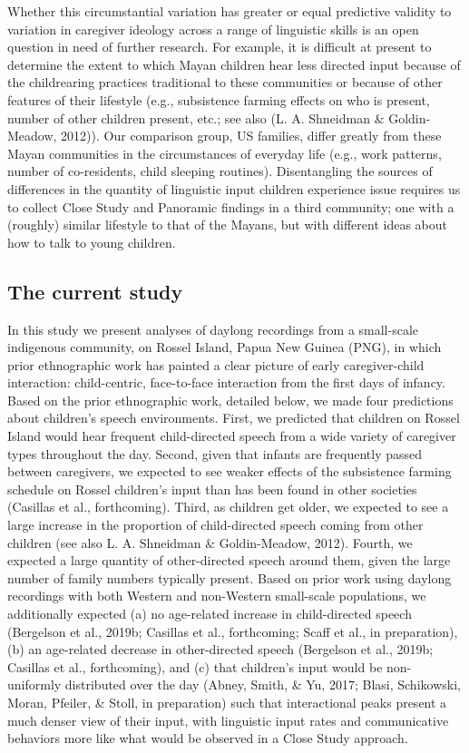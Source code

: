 \documentclass[,man,floatsintext]{apa6}
\begin{document}
Whether this circumstantial variation has greater or equal predictive
validity to variation in caregiver ideology across a range of linguistic
skills is an open question in need of further research. For example, it
is difficult at present to determine the extent to which Mayan children
hear less directed input because of the childrearing practices
traditional to these communities or because of other features of their
lifestyle (e.g., subsistence farming effects on who is present, number
of other children present, etc.; see also (L. A. Shneidman \&
Goldin-Meadow, 2012)). Our comparison group, US families, differ greatly
from these Mayan communities in the circumstances of everyday life
(e.g., work patterns, number of co-residents, child sleeping routines).
Disentangling the sources of differences in the quantity of linguistic
input children experience issue requires us to collect Close Study and
Panoramic findings in a third community; one with a (roughly) similar
lifestyle to that of the Mayans, but with different ideas about how to
talk to young children.

\subsection{The current study}\label{the-current-study}

In this study we present analyses of daylong recordings from a
small-scale indigenous community, on Rossel Island, Papua New Guinea
(PNG), in which prior ethnographic work has painted a clear picture of
early caregiver-child interaction: child-centric, face-to-face
interaction from the first days of infancy. Based on the prior
ethnographic work, detailed below, we made four predictions about
children's speech environments. First, we predicted that children on
Rossel Island would hear frequent child-directed speech from a wide
variety of caregiver types throughout the day. Second, given that
infants are frequently passed between caregivers, we expected to see
weaker effects of the subsistence farming schedule on Rossel children's
input than has been found in other societies (Casillas et al.,
forthcoming). Third, as children get older, we expected to see a large
increase in the proportion of child-directed speech coming from other
children (see also L. A. Shneidman \& Goldin-Meadow, 2012). Fourth, we
expected a large quantity of other-directed speech around them, given
the large number of family numbers typically present. Based on prior
work using daylong recordings with both Western and non-Western
small-scale populations, we additionally expected (a) no age-related
increase in child-directed speech (Bergelson et al., 2019b; Casillas et
al., forthcoming; Scaff et al., in preparation), (b) an age-related
decrease in other-directed speech (Bergelson et al., 2019b; Casillas et
al., forthcoming), and (c) that children's input would be non-uniformly
distributed over the day (Abney, Smith, \& Yu, 2017; Blasi, Schikowski,
Moran, Pfeiler, \& Stoll, in preparation) such that interactional peaks
present a much denser view of their input, with linguistic input rates
and communicative behaviors more like what would be observed in a Close
Study approach.
\end{document}
